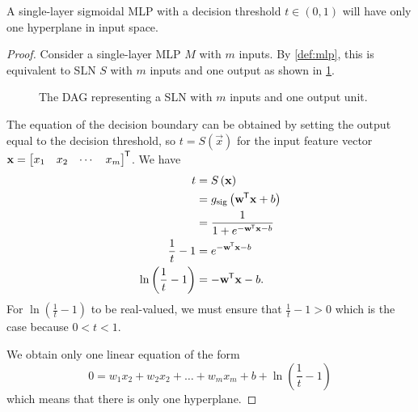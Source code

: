 \begin{lemma}
    \label{lmm:sigmoid_decision_boundary}
    A single-layer sigmoidal MLP with a decision threshold $t \in (0,1)$ will have only one hyperplane in input space.
\end{lemma}
\begin{proof}
    Consider a single-layer MLP $M$ with $m$ inputs. 
    By \ref{def:mlp}, this is equivalent to SLN $S$ with $m$ inputs and one output as shown in \ref{fig:sln_m_in_1_out}. 
    \begin{figure}
        \begin{center}
        \end{center}
        \caption{The DAG representing a SLN with $m$ inputs and one output unit.}
        \label{fig:sln_m_in_1_out}
    \end{figure}
    The equation of the decision boundary can be obtained by setting the output equal to the decision threshold, so
    $t = S\left(\vec{x}\right)$
    for the input feature vector
    $\mathbf{x}= \begin{bmatrix}
        x_1 & x_2 & \cdots & x_m
    \end{bmatrix}^{\mkern-1.5mu\mathsf{T}}$.
    We have
    \begin{align*}
        t &= S\left(\mathbf{x}\right) \\
        &= g_\text{sig}\left(\mathbf{w}^{\mkern-1.5mu\mathsf{T}} \mathbf{x} + b\right) \\
        &= \frac{1}{1+e^{-\mathbf{w}^{\mkern-1.5mu\mathsf{T}} \mathbf{x} - b}} \\
        \frac{1}{t} - 1 &= e^{-\mathbf{w}^{\mkern-1.5mu\mathsf{T}} \mathbf{x} - b} \\
        \ln \left(\frac{1}{t} - 1\right) &= -\mathbf{w}^{\mkern-1.5mu\mathsf{T}} \mathbf{x} - b.
    \end{align*}
    For $\ln \left(\frac{1}{t} - 1\right)$ to be real-valued, we must ensure that $\frac{1}{t} - 1 > 0$ which is the case because $0<t<1$.

    We obtain only one linear equation of the form
    \begin{equation}
        \label{eq:sigmoid_hyperplane}
        0=w_1 x_2 + w_2 x_2 + \dots + w_m x_m + b + \ln \left(\frac{1}{t} - 1\right)
    \end{equation}
    which means that there is only one hyperplane.
\end{proof}

